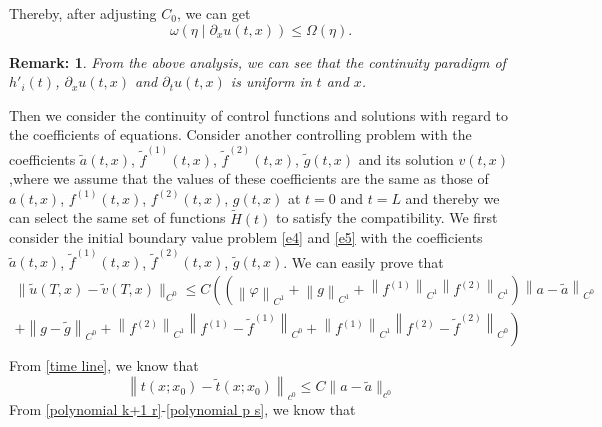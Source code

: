 \documentclass[a4paper,reqno,11pt]{amsart}
\numberwithin{equation}{section} %
\newtheorem*{rem}{Remark:}
\begin{document}
Thereby, after adjusting $C_0$, we can get
$$
\omega \left( \eta \mid \partial _xu(t,x) \right) \leqslant \varOmega (\eta ).
$$
\begin{rem}
	From the above analysis, we can see that the continuity paradigm of $h'_i(t) $, $\partial _xu(t,x)$ and $\partial _tu(t,x)$ is uniform in $t$ and $x$.
\end{rem}
Then we consider the continuity of control functions and solutions with regard to the coefficients of equations.
Consider another controlling problem with the coefficients $\tilde{a} (t,x)$, $\tilde{f}^{(1)} (t,x)$, $\tilde{f}^{(2)} (t,x)$, $\tilde{g} (t,x)$ and its solution $v(t,x)$,where we assume that the values of these coefficients are the same as those of $a(t,x)$, $f^{(1)}(t,x)$, $f^{(2)}(t,x)$, $g(t,x)$ at $t=0$ and $t=L$ and thereby we can select the same set of functions $\widetilde{H}(t)$ to satisfy the compatibility.
We first consider the initial boundary value problem \eqref{e4} and \eqref{e5} with the coefficients $\tilde{a} (t,x)$, $\tilde{f}^{(1)} (t,x)$, $\tilde{f}^{(2)} (t,x)$, $\tilde{g} (t,x)$.%
We can easily prove that 
$$
\begin{array}{c}
	\parallel \tilde{u}(T,x)-\tilde{v}(T,x)\parallel _{C^0}\leqslant C\left( \left( \left\| \varphi \right\| _{C^1}+\left\| g \right\| _{C^1}+\left\| f^{(1)} \right\| _{C^1}\left\| f^{(2)} \right\| _{C^1} \right) \left\| a-\tilde{a} \right\| _{C^0} \right.\\
	\left. +\left\| g-\tilde{g} \right\| _{C^0}+\left\| f^{(2)} \right\| _{C^1}\left\| f^{(1)}-\tilde{f}^{(1)} \right\| _{C^0}+\left\| f^{(1)} \right\| _{C^1}\left\| f^{(2)}-\tilde{f}^{(2)} \right\| _{C^0} \right)\\
\end{array}
$$
From \eqref{time line}, we know that
$$
\left\| t\left( x;x_0 \right) -\tilde{t}\left( x;x_0 \right) \right\| _{c^0}\leqslant C\parallel a-\tilde{a}\parallel _{c^0}
$$
From \eqref{polynomial k+1 r}-\eqref{polynomial p s}, we know that
\end{document}
